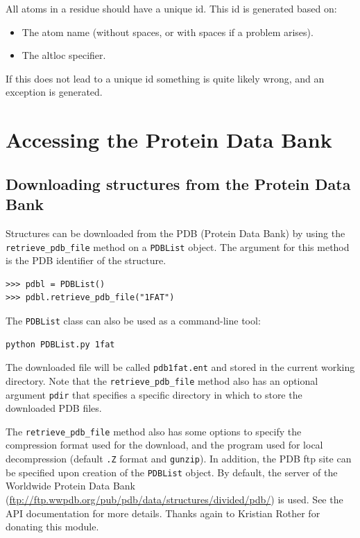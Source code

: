 All atoms in a residue should have a unique id. This id is generated based on:

\begin{itemize}
\item The atom name (without spaces, or with spaces if a problem arises).
\item The altloc specifier.
\end{itemize}
If this does not lead to a unique id something is quite likely wrong, and an
exception is generated.

\section{Accessing the Protein Data Bank}

\subsection{Downloading structures from the Protein Data Bank}

Structures can be downloaded from the PDB (Protein Data Bank)
by using the \texttt{retrieve\_pdb\_file} method on a \texttt{PDBList} object.
The argument for this method is the PDB identifier of the structure.

\begin{verbatim}
>>> pdbl = PDBList()
>>> pdbl.retrieve_pdb_file("1FAT")
\end{verbatim}

The \texttt{PDBList} class can also be used as a command-line tool:
\begin{verbatim}
python PDBList.py 1fat
\end{verbatim}
The downloaded file will be called \texttt{pdb1fat.ent} and stored
in the current working directory. Note that the \texttt{retrieve\_pdb\_file}
method also has an optional argument \texttt{pdir} that specifies
a specific directory in which to store the downloaded PDB files.

The \texttt{retrieve\_pdb\_file} method also has some options to specify
the compression format used for the download, and the program used
for local decompression (default \texttt{.Z} format and \texttt{gunzip}).
In addition, the PDB ftp site can be specified upon creation of the
\texttt{PDBList} object. By default, the server of the Worldwide Protein Data Bank (\url{ftp://ftp.wwpdb.org/pub/pdb/data/structures/divided/pdb/})
is used. See the API documentation for more details. Thanks again
to Kristian Rother for donating this module.

